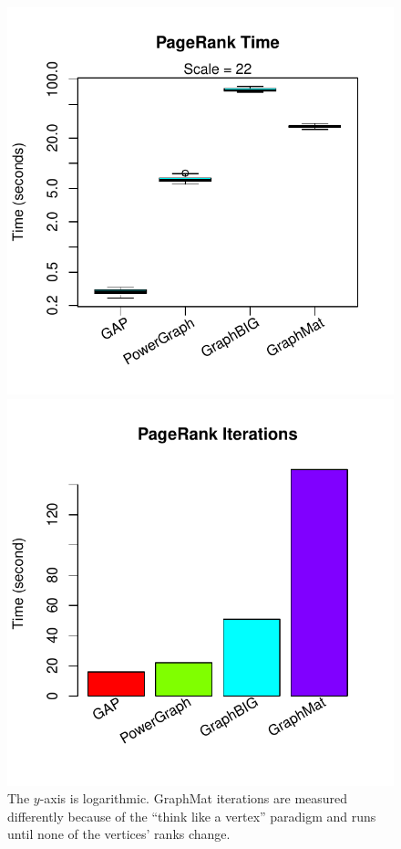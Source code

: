 \documentclass{llncs}
\begin{document}
\begin{figure}
	\centering
	\begin{minipage}{0.48\linewidth}
		\includegraphics[width=\linewidth, trim=0 24pt 18pt 0, clip]{graphics/pr_time.pdf}
	\end{minipage}
	\begin{minipage}{0.48\linewidth}
		\includegraphics[width=\linewidth, trim=0 24pt 18pt 0, clip]{graphics/pr_iters.pdf}
	\end{minipage}
	\caption{The $y$-axis is logarithmic. GraphMat iterations are measured differently because of the ``think like a vertex'' paradigm and runs until none of the vertices' ranks change.}
	\label{fig:pr}
\end{figure}
\end{document}
